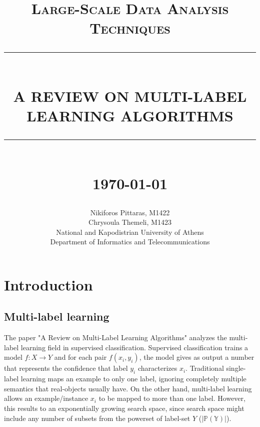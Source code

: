 \documentclass[12pt]{report}
\newcommand{\HRule}[1]{\rule{\linewidth}{#1}}
\begin{document}
	
	\title{ \normalsize \textsc{Large-Scale Data Analysis Techniques}
		\\ [2.0cm]
		\HRule{0.5pt} \\
		\LARGE \textbf{\uppercase{A Review on Multi-Label Learning Algorithms}}
		\HRule{2pt} \\ [0.5cm]
		\normalsize \today \vspace*{5\baselineskip}}
	
	\date{}
	\author{
		Nikiforos Pittaras, M1422\\
		Chrysoula Themeli, M1423 \\ 
		National and Kapodistrian University of Athens\\
		Department of Informatics and Telecommunications }
	
	\maketitle
	\tableofcontents
	\listoffigures
	\newpage
	
	\sectionfont{\scshape}
	
	
	\section*{Introduction}
	
	\subsection*{Multi-label learning}
	The paper "A Review on Multi-Label Learning Algorithms" analyzes the multi-label learning field in supervised classification. Supervised classification trains a model $f: X \rightarrow Y$ and for each pair $f(x_i,y_i)$, the model gives as output a number that represents the confidence that label $y_i$ characterizes $x_i$. Traditional single-label learning maps an example to only one label, ignoring completely multiple semantics that real-objects usually have. On the other hand, multi-label learning allows an example/instance $x_i$ to be mapped to more than one label. However, this results to an exponentially growing search space, since search space might include any number of subsets from the powerset of label-set $Y$ ($|\mathbb{P(Y)}|$).
	
\end{document}
